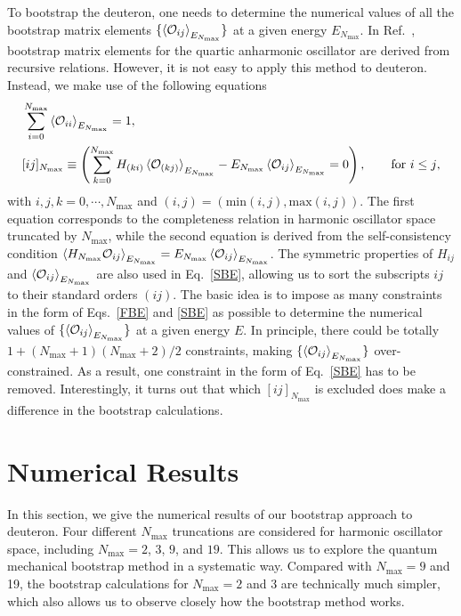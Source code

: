\documentclass[aps,prc,reprint,superscriptaddress,nofootinbib]{revtex4-2}
\begin{document}
\begin{widetext}
To bootstrap the deuteron, one needs to determine the numerical values of all the bootstrap matrix elements $\{\braket{\mathcal{O}_{ij}}_{E_{N_\text{max}}}\}$
at a given energy $E_{N_\text{max}}$.
In Ref.~\cite{Han:2020bkb}, bootstrap matrix elements for the quartic anharmonic oscillator are derived from recursive relations.
However, it is not easy to apply this method to deuteron. 
Instead, we make use of the following equations
\begin{align}
&\sum_{i=0}^{N_\text{max}} \braket{\mathcal{O}_{ii}}_{E_{N_\text{max}}}=1,\label{FBE}\\
&[ij]_{N_\text{max}}\equiv\left(\sum_{k=0}^{N_\text{max}}H_{(ki)}\braket{\mathcal{O}_{(kj)}}_{E_{N_\text{max}}}-E_{N_\text{max}}\braket{\mathcal{O}_{ij}}_{E_{N_\text{max}}}=0\right),\qquad\text{for $i\leq j$},
\label{SBE}
\end{align} 
with $i,j,k=0,\cdots,N_\text{max}$
and $(i,j)=(\text{min}(i,j),\text{max}(i,j))$.
The first equation corresponds to the completeness relation in harmonic oscillator space truncated by $N_\text{max}$,
while the second equation is derived from the self-consistency condition $\braket{H_{N_\text{max}}\mathcal{O}_{ij}}_{E_{N_\text{max}}}=E_{N_\text{max}}\braket{\mathcal{O}_{ij}}_{E_{N_\text{max}}}$.
The symmetric properties of $H_{ij}$ and $\braket{\mathcal{O}_{ij}}_{E_{N_\text{max}}}$ are also used in Eq.~\eqref{SBE},
allowing us to sort the subscripts $ij$ to their standard orders $(ij)$.
The basic idea is to impose as many constraints in the form of Eqs.~\eqref{FBE} and \eqref{SBE} as possible to determine the numerical values of $\{\braket{\mathcal{O}_{ij}}_{E_{N_\text{max}}}\}$ at a given energy $E$.
In principle, 
there could be totally $1+(N_\text{max}+1)(N_\text{max}+2)/2$ constraints,
making $\{\braket{\mathcal{O}_{ij}}_{E_{N_\text{max}}}\}$ over-constrained. 
As a result, one constraint in the form of Eq.~\eqref{SBE} has to be removed.
Interestingly, it turns out that which $[ij]_{N_\text{max}}$ is excluded does make a difference in the bootstrap calculations.

\section{Numerical Results}
\label{Deuteron}

In this section, we give the numerical results of our bootstrap approach to deuteron.
Four different $N_\text{max}$ truncations are considered for harmonic oscillator space,
including $N_\text{max}=2$, $3$, $9$, and $19$.
This
allows us to explore the quantum mechanical bootstrap method in a systematic way.
Compared with $N_\text{max}=9$ and 19,
the bootstrap calculations for $N_\text{max}=2$ and 3
are technically much simpler,
which also allows us to observe closely how the bootstrap method works.


\end{widetext}
\end{document}
